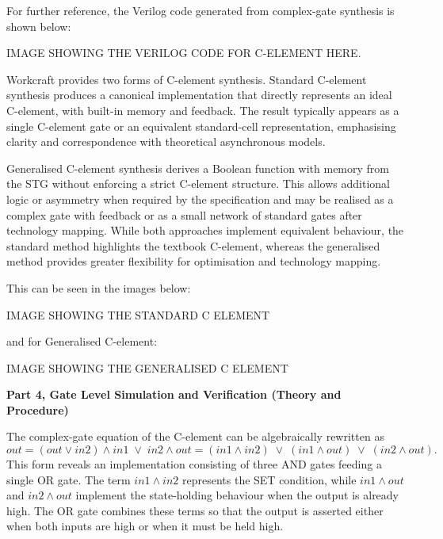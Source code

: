 \documentclass[a4paper,12pt]{article}
\begin{document}
For further reference, the Verilog code generated from complex-gate synthesis is shown below:

\begin{large}
    IMAGE SHOWING THE VERILOG CODE FOR C-ELEMENT HERE.
\end{large}

Workcraft provides two forms of C-element synthesis. Standard C-element synthesis produces a canonical implementation that directly represents an ideal C-element, with built-in memory and feedback. The result typically appears as a single C-element gate or an equivalent standard-cell representation, emphasising clarity and correspondence with theoretical asynchronous models.

Generalised C-element synthesis derives a Boolean function with memory from the STG without enforcing a strict C-element structure. This allows additional logic or asymmetry when required by the specification and may be realised as a complex gate with feedback or as a small network of standard gates after technology mapping. While both approaches implement equivalent behaviour, the standard method highlights the textbook C-element, whereas the generalised method provides greater flexibility for optimisation and technology mapping.

This can be seen in the images below:

\begin{large}
IMAGE SHOWING THE STANDARD C ELEMENT
\end{large}

and for Generalised C-element:

\begin{large}
IMAGE SHOWING THE GENERALISED C ELEMENT
\end{large}

\textbf{Part 4, Gate Level Simulation and Verification (Theory and Procedure)}

The complex-gate equation of the C-element can be algebraically rewritten as
\[
out = (out \lor in2)\land in1 \;\lor\; in2 \land out
     = (in1 \land in2) \;\lor\; (in1 \land out) \;\lor\; (in2 \land out).
\]
This form reveals an implementation consisting of three AND gates feeding a single OR gate. The term $in1 \land in2$ represents the SET condition, while $in1 \land out$ and $in2 \land out$ implement the state-holding behaviour when the output is already high. The OR gate combines these terms so that the output is asserted either when both inputs are high or when it must be held high.
\end{document}
